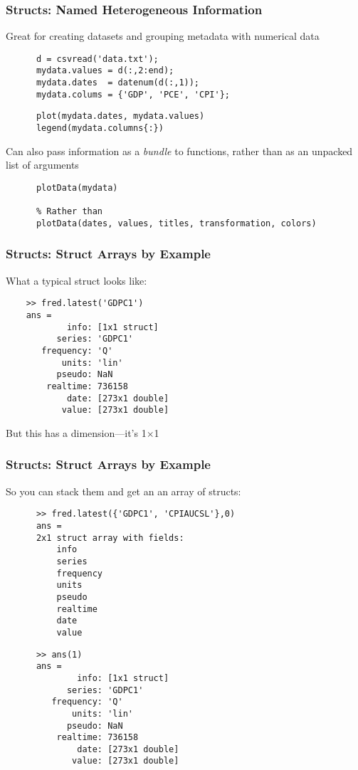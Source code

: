 \documentclass{beamer}
\begin{document}
  \begin{frame}[fragile]
    \frametitle{Structs: Named Heterogeneous Information}

    Great for creating datasets and grouping metadata with numerical data
    \begin{lstlisting}
      d = csvread('data.txt');
      mydata.values = d(:,2:end);
      mydata.dates  = datenum(d(:,1));
      mydata.colums = {'GDP', 'PCE', 'CPI'};
    \end{lstlisting}\pause
    \begin{lstlisting}
      plot(mydata.dates, mydata.values)
      legend(mydata.columns{:})
    \end{lstlisting}
    Can also pass information as a \emph{bundle} to functions, rather
    than as an unpacked list of arguments
    \begin{lstlisting}
      plotData(mydata)

      % Rather than
      plotData(dates, values, titles, transformation, colors)
    \end{lstlisting}
	\end{frame}



  \begin{frame}[fragile]
    \frametitle{Structs: Struct Arrays by Example}

    What a typical struct looks like:
    \lstset{style=matlabNoBlue}
    \begin{lstlisting}
    >> fred.latest('GDPC1')
    ans =
            info: [1x1 struct]
          series: 'GDPC1'
       frequency: 'Q'
           units: 'lin'
          pseudo: NaN
        realtime: 736158
            date: [273x1 double]
           value: [273x1 double]
    \end{lstlisting}\pause
    \lstset{style=matlab}
    But this has a dimension---it's 1$\times$1
	\end{frame}


  \begin{frame}[fragile]
    \frametitle{Structs: Struct Arrays by Example}

      So you can stack them and get an an array of structs:
      \lstset{style=matlabNoBlue}
      \begin{lstlisting}
      >> fred.latest({'GDPC1', 'CPIAUCSL'},0)
      ans =
      2x1 struct array with fields:
          info
          series
          frequency
          units
          pseudo
          realtime
          date
          value
      \end{lstlisting}\pause
      \begin{lstlisting}
      >> ans(1)
      ans =
              info: [1x1 struct]
            series: 'GDPC1'
         frequency: 'Q'
             units: 'lin'
            pseudo: NaN
          realtime: 736158
              date: [273x1 double]
             value: [273x1 double]
      \end{lstlisting}
      \lstset{style=matlab}
	\end{frame}
\end{document}

